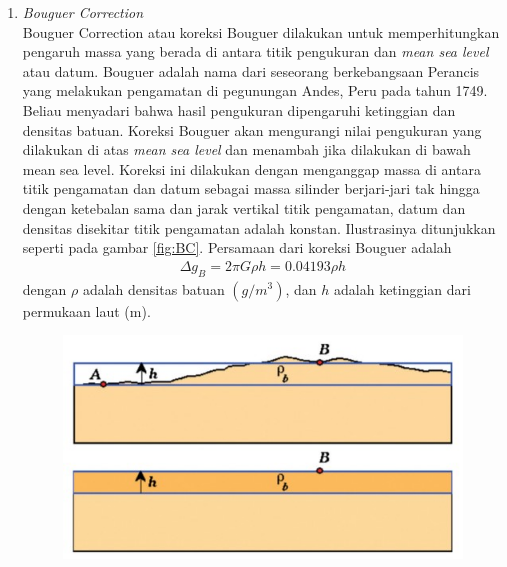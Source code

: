 \begin{enumerate}
	\vskip 5pt
	\item \textit{Bouguer Correction}\\
	Bouguer Correction atau koreksi Bouguer dilakukan untuk memperhitungkan pengaruh massa yang berada di antara titik pengukuran dan \textit{mean sea level} atau datum. Bouguer adalah nama dari seseorang berkebangsaan Perancis yang melakukan pengamatan di pegunungan Andes, Peru pada tahun 1749. Beliau menyadari bahwa hasil pengukuran dipengaruhi ketinggian dan densitas batuan. Koreksi Bouguer akan mengurangi nilai pengukuran yang dilakukan di atas \textit{mean sea level} dan menambah jika dilakukan di bawah mean sea level. Koreksi ini dilakukan dengan menganggap massa di antara titik pengamatan dan datum sebagai massa silinder berjari-jari tak hingga dengan ketebalan sama dan jarak vertikal titik pengamatan, datum dan densitas disekitar titik pengamatan adalah konstan. Ilustrasinya ditunjukkan seperti pada gambar \ref{fig:BC}. Persamaan dari koreksi Bouguer adalah
	\begin{align}
		\Delta g_{B} = 2\pi G\rho h = 0.04193\rho h\label{eqn:gB}
	\end{align}
	dengan $\rho$ adalah densitas batuan $(g/m^{3})$, dan $h$ adalah ketinggian dari permukaan laut (m).
	\vskip 5pt
	\begin{figure}[h]
		\centering
		\includegraphics[scale=0.6]{Figs/BC.jpg}

\end{figure}
\end{enumerate}
